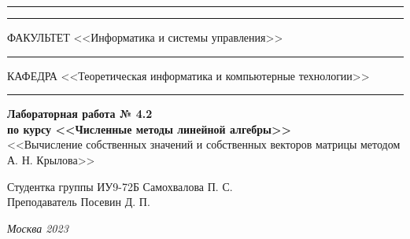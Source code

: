 \documentclass[a4paper, 14pt]{extarticle}
\begin{document}
\begin{titlepage}
\vspace{-25pt}
\hspace{-35pt}\rule{\textwidth}{2.3pt}

\vspace*{-20.3pt}
\hspace{-35pt}\rule{\textwidth}{0.4pt}

\vspace{1.5ex}
\hspace{-35pt} \noindent \small ФАКУЛЬТЕТ\hspace{80pt} <<Информатика и системы управления>>

\vspace*{-16pt}
\hspace{47pt}\rule{0.83\textwidth}{0.4pt}

\vspace{0.5ex}
\hspace{-35pt} \noindent \small КАФЕДРА\hspace{50pt} <<Теоретическая информатика и компьютерные технологии>>

\vspace*{-16pt}
\hspace{30pt}\rule{0.866\textwidth}{0.4pt}
  
\vspace{11em}

\begin{center}
\Large {\bf Лабораторная работа № 4.2} \\
\large {\bf по курсу <<Численные методы линейной алгебры>>} \\
\large <<Вычисление собственных значений и собственных
векторов матрицы методом А. Н. Крылова>>
\end{center}\normalsize

\vspace{8em}


\begin{flushright}
  {Студентка группы ИУ9-72Б Самохвалова П. С. \hspace*{15pt}\\
  \vspace{2ex}
  Преподаватель Посевин Д. П.\hspace*{15pt}}
\end{flushright}

\bigskip

\vfill
 

\begin{center}
\textsl{Москва 2023}
\end{center}
\end{titlepage}
\end{document}
